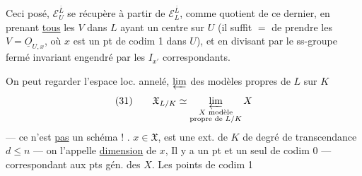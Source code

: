 Ceci posé, $\mathcal E_U^{\overline L}$ se récupère à partir de $\mathcal E_L^{\overline L}$, comme quotient de ce dernier, en prenant \uline{tous} les $V$ dans $L$ ayant un centre sur $U$ (il suffit $=$ de prendre les $V=\underline{O}_{U,x}$, où $x$ est un pt de codim 1 dans $U$), et en divisant par le ss-groupe fermé invariant engendré par les $I_{x'}$ correspondants.

On peut regarder l'espace loc. annelé, $\varprojlim$ des modèles  propres de $L$ sur $K$
\[
(31)\qquad\mathfrak X_{L/K}\simeq\varprojlim_{\substack{X\text{ modèle}\\\text{propre de }L/K}}X
\]
--- ce n'est \uline{pas} un schéma ! .  
$x\in\mathfrak X$,   est une ext. de $K$ de degré de transcendance $d\leq n$ --- on l'appelle \uline{dimension} de $x$,  Il y a un pt et un seul de codim 0 --- correspondant aux pts gén. des $X$. Les points de codim 1
